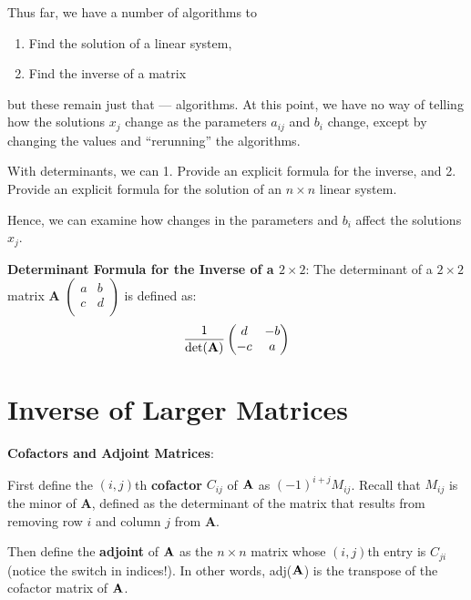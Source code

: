 \documentclass[]{book}
\providecommand{\tightlist}{%
  \setlength{\itemsep}{0pt}\setlength{\parskip}{0pt}}
\theoremstyle{definition}
\theoremstyle{definition}
\theoremstyle{definition}
\theoremstyle{remark}
\begin{document}
Thus far, we have a number of algorithms to

\begin{enumerate}
\def\labelenumi{\arabic{enumi}.}
\tightlist
\item
  Find the solution of a linear system,
\item
  Find the inverse of a matrix
\end{enumerate}

but these remain just that --- algorithms. At this point, we have no way
of telling how the solutions \(x_j\) change as the parameters \(a_{ij}\)
and \(b_i\) change, except by changing the values and ``rerunning'' the
algorithms.

With determinants, we can 1. Provide an explicit formula for the
inverse, and 2. Provide an explicit formula for the solution of an
\(n\times n\) linear system.

Hence, we can examine how changes in the parameters and \(b_i\) affect
the solutions \(x_j\).

\textbf{Determinant Formula for the Inverse of a \(2 \times 2\)}: The
determinant of a \(2 \times 2\) matrix \textbf{A}
\(\begin{pmatrix} a & b\\ c & d\\ \end{pmatrix}\) is defined as:
\[\frac{1}{\det({\bf A})} \begin{pmatrix}
            d & -b\\
            -c & a\\
        \end{pmatrix}\]

\section{Inverse of Larger Matrices}\label{inverse-of-larger-matrices}

\textbf{Cofactors and Adjoint Matrices}:

First define the \((i,j)\)th \textbf{cofactor} \(C_{ij}\) of \({\bf A}\)
as \((-1)^{i+j}M_{ij}\). Recall that \(M_{ij}\) is the minor of
\textbf{A}, defined as the determinant of the matrix that results from
removing row \(i\) and column \(j\) from \textbf{A}.

Then define the \textbf{adjoint} of \({\bf A}\) as the \(n\times n\)
matrix whose \((i,j)\)th entry is \(C_{ji}\) (notice the switch in
indices!). In other words, adj(\({\bf A}\)) is the transpose of the
cofactor matrix of \({\bf A}\).
\end{document}
